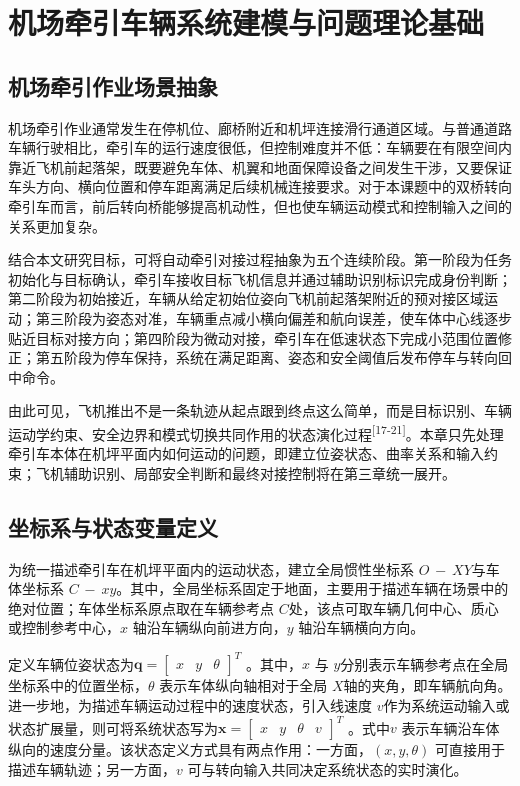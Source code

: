 \section{机场牵引车辆系统建模与问题理论基础}

\subsection{机场牵引作业场景抽象}

机场牵引作业通常发生在停机位、廊桥附近和机坪连接滑行通道区域。与普通道路车辆行驶相比，牵引车的运行速度很低，但控制难度并不低：车辆要在有限空间内靠近飞机前起落架，既要避免车体、机翼和地面保障设备之间发生干涉，又要保证车头方向、横向位置和停车距离满足后续机械连接要求。对于本课题中的双桥转向牵引车而言，前后转向桥能够提高机动性，但也使车辆运动模式和控制输入之间的关系更加复杂。

结合本文研究目标，可将自动牵引对接过程抽象为五个连续阶段。第一阶段为任务初始化与目标确认，牵引车接收目标飞机信息并通过辅助识别标识完成身份判断；第二阶段为初始接近，车辆从给定初始位姿向飞机前起落架附近的预对接区域运动；第三阶段为姿态对准，车辆重点减小横向偏差和航向误差，使车体中心线逐步贴近目标对接方向；第四阶段为微动对接，牵引车在低速状态下完成小范围位置修正；第五阶段为停车保持，系统在满足距离、姿态和安全阈值后发布停车与转向回中命令。

由此可见，飞机推出不是一条轨迹从起点跟到终点这么简单，而是目标识别、车辆运动学约束、安全边界和模式切换共同作用的状态演化过程\textsuperscript{[17-21]}。本章只先处理牵引车本体在机坪平面内如何运动的问题，即建立位姿状态、曲率关系和输入约束；飞机辅助识别、局部安全判断和最终对接控制将在第三章统一展开。

\subsection{坐标系与状态变量定义}

为统一描述牵引车在机坪平面内的运动状态，建立全局惯性坐标系
\(O\text{ } - \text{ }XY\)与车体坐标系
\(C\text{ } - \text{ }xy\)。其中，全局坐标系固定于地面，主要用于描述车辆在场景中的绝对位置；车体坐标系原点取在车辆参考点
\(C\)处，该点可取车辆几何中心、质心或控制参考中心，\(x\)
轴沿车辆纵向前进方向，\(y\) 轴沿车辆横向方向。

定义车辆位姿状态为\(\mathbf{q} = \begin{bmatrix}
x & y & \theta
\end{bmatrix}^{T}\) 。其中，\(x\) 与
\(y\)分别表示车辆参考点在全局坐标系中的位置坐标，\(\theta\)
表示车体纵向轴相对于全局
\(X\)轴的夹角，即车辆航向角。进一步地，为描述车辆运动过程中的速度状态，引入线速度
\(v\)作为系统运动输入或状态扩展量，则可将系统状态写为\(\mathbf{x} = \begin{bmatrix}
x & y & \theta & v
\end{bmatrix}^{T}\) 。式中\(v\)
表示车辆沿车体纵向的速度分量。该状态定义方式具有两点作用：一方面，\(\left( x,y,\theta \right)\)
可直接用于描述车辆轨迹；另一方面，\(v\)
可与转向输入共同决定系统状态的实时演化。

